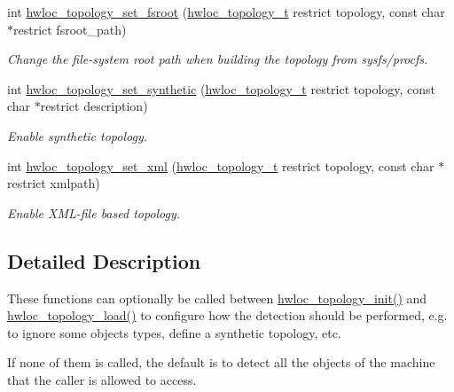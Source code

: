 \begin{DoxyCompactItemize}
int \hyperlink{group__hwlocality__configuration_ga45a6b5dd59be36879a64a7f73e0363c2}{hwloc\_\-topology\_\-set\_\-fsroot} (\hyperlink{group__hwlocality__topology_ga9d1e76ee15a7dee158b786c30b6a6e38}{hwloc\_\-topology\_\-t} restrict topology, const char $\ast$restrict fsroot\_\-path)
\begin{DoxyCompactList}\small\item\em Change the file-\/system root path when building the topology from sysfs/procfs. \item\end{DoxyCompactList}\item 
int \hyperlink{group__hwlocality__configuration_ga5c11f6e454ebd5f4089670269e097a1e}{hwloc\_\-topology\_\-set\_\-synthetic} (\hyperlink{group__hwlocality__topology_ga9d1e76ee15a7dee158b786c30b6a6e38}{hwloc\_\-topology\_\-t} restrict topology, const char $\ast$restrict description)
\begin{DoxyCompactList}\small\item\em Enable synthetic topology. \item\end{DoxyCompactList}\item 
int \hyperlink{group__hwlocality__configuration_ga29b8ebec1b85b324af18fdf5040806bf}{hwloc\_\-topology\_\-set\_\-xml} (\hyperlink{group__hwlocality__topology_ga9d1e76ee15a7dee158b786c30b6a6e38}{hwloc\_\-topology\_\-t} restrict topology, const char $\ast$restrict xmlpath)
\begin{DoxyCompactList}\small\item\em Enable XML-\/file based topology. \item\end{DoxyCompactList}\end{DoxyCompactItemize}


\subsection{Detailed Description}
These functions can optionally be called between \hyperlink{group__hwlocality__creation_ga03fd4a16d8b9ee1ffc32b25fd2f6bdfa}{hwloc\_\-topology\_\-init()} and \hyperlink{group__hwlocality__creation_gabdf58d87ad77f6615fccdfe0535ff826}{hwloc\_\-topology\_\-load()} to configure how the detection should be performed, e.g. to ignore some objects types, define a synthetic topology, etc.

If none of them is called, the default is to detect all the objects of the machine that the caller is allowed to access.

